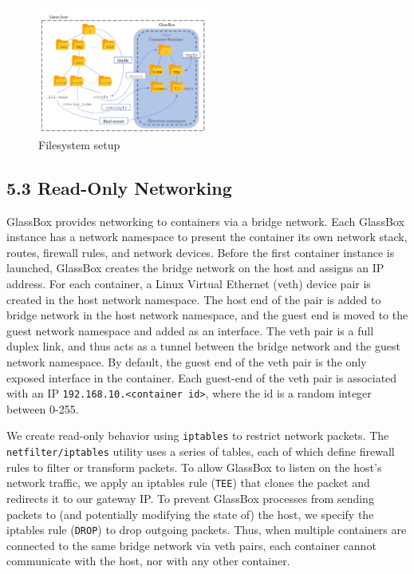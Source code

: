 \documentclass{proc}
\begin{document}

\begin{figure}
\includegraphics[width=0.5\textwidth]{fs_diagram}
\caption{Filesystem setup}
\end{figure}

\subsection*{5.3 Read-Only Networking}

GlassBox provides networking to containers via a bridge network. Each GlassBox instance has a network namespace to present the container its own network stack, routes, firewall rules, and network devices. Before the first container instance is launched, GlassBox creates the bridge network on the host and assigns an IP address. For each container, a Linux Virtual Ethernet (veth) device pair is created in the host network namespace. The host end of the pair is added to bridge network in the host network namespace, and the guest end is moved to the guest network namespace and added as an interface. The veth pair is a full duplex link, and thus acts as a tunnel between the bridge network and the guest network namespace. By default, the guest end of the veth pair is the only exposed interface in the container. Each guest-end of the veth pair is associated with an IP \texttt{192.168.10.<container id>}, where the id is a random integer between 0-255.

We create read-only behavior using \texttt{iptables} to restrict network packets. The \texttt{netfilter/iptables} utility uses a series of tables, each of which define firewall rules to filter or transform packets. To allow GlassBox to listen on the host's network traffic, we apply an iptables rule (\texttt{TEE}) that clones the packet and redirects it to our gateway IP. To prevent GlassBox processes from sending packets to (and potentially modifying the state of) the host, we specify the iptables rule (\texttt{DROP}) to drop outgoing packets. Thus, when multiple containers are connected to the same bridge network via veth pairs, each container cannot communicate with the host, nor with any other container.
\end{document}
